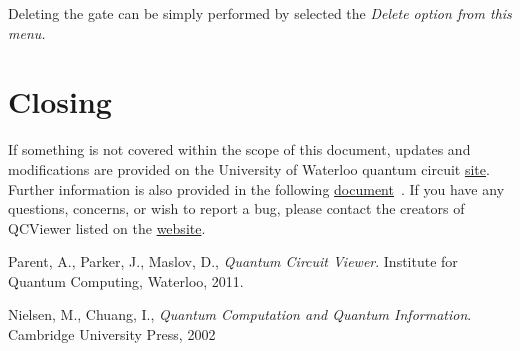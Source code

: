 \documentclass[10pt]{article}
\theoremstyle{definition}
\begin{document}
Deleting the gate can be simply performed by selected the \em Delete \em option from this menu.

\section{Closing}
If something is not covered within the scope of this document, updates and modifications are provided on the University of Waterloo quantum circuit \href{http://qcirc.iqc.uwaterloo.ca/index.php?n=Projects.QCViewer}{site}. Further information is also provided in the following \href{http://qcirc.iqc.uwaterloo.ca/QCViewer/QCViewer.pdf}{document}~\cite{Parent2011Quantum}. If you have any questions, concerns, or wish to report a bug, please contact the creators of QCViewer listed on the \href{http://qcirc.iqc.uwaterloo.ca/index.php?n=Projects.QCViewer}{website}.

\begin{thebibliography}{9}


  Parent, A., Parker, J., Maslov, D.,
  \emph{Quantum Circuit Viewer}.
  Institute for Quantum Computing, Waterloo,
  2011.

  Nielsen, M., Chuang, I.,
  \emph{Quantum Computation and Quantum Information}.
   Cambridge University Press,
   2002

\end{thebibliography}
\end{document}
